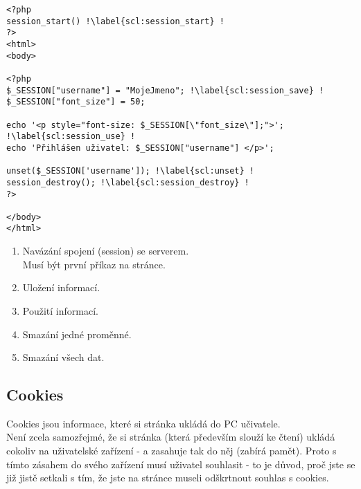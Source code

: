 \begin{minipage}[t]{.45\textwidth}
\begin{code}
\begin{verbatim}
<?php
session_start() !\label{scl:session_start} !
?>
<html>
<body>

<?php
$_SESSION["username"] = "MojeJmeno"; !\label{scl:session_save} !
$_SESSION["font_size"] = 50;
  
echo '<p style="font-size: $_SESSION[\"font_size\"];">'; !\label{scl:session_use} !
echo 'Přihlášen uživatel: $_SESSION["username"] </p>'; 

unset($_SESSION['username']); !\label{scl:unset} !
session_destroy(); !\label{scl:session_destroy} !
?>

</body>
</html> 
\end{verbatim}

\label{code:session}
\end{code}
\end{minipage}
\begin{minipage}[t]{.45\textwidth}
\begin{enumerate}
\item[ř. \ref{scl:session_start}:] Navázání spojení (session) se serverem.\\Musí být první příkaz na stránce.
\item[ř. \ref{scl:session_save}:] Uložení informací.
\item[ř. \ref{scl:session_use}:] Použití informací.
\item[ř. \ref{scl:unset}:] Smazání jedné proměnné.
\item[ř. \ref{scl:session_destroy}:] Smazání všech dat.
\end{enumerate}
\end{minipage}

\subsection{Cookies}
Cookies jsou informace, které si stránka ukládá do PC učivatele.\\
Není zcela samozřejmé, že si stránka (která především slouží ke čtení) ukládá cokoliv na uživatelské zařízení - a zasahuje tak do něj (zabírá pamět). Proto s tímto zásahem do svého zařízení musí uživatel souhlasit - to je důvod, proč jste se již jistě setkali s tím, že jste na stránce museli odškrtnout souhlas s cookies.\\

